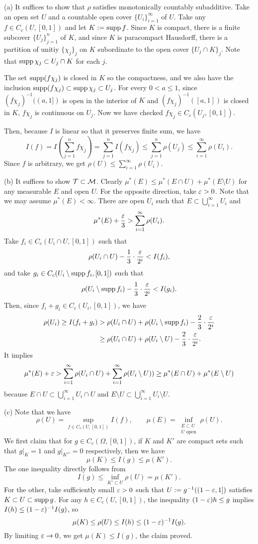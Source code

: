 \documentclass{../../large}
\begin{document}
\begin{pf}
(a)
It suffices to show that $\rho$ satisfies monotonically countably subadditive.
Take an open set $U$ and a countable open cover $\{U_i\}_{i=1}^\infty$ of $U$.
Take any $f\in C_c(U,[0,1])$ and let $K:=\operatorname{supp} f$.
Since $K$ is compact, there is a finite subcover $\{U_j\}_{j=1}^n$ of $K$, and since $K$ is paracompact Hausdorff, there is a partition of unitiy $\{\chi_j\}_j$ on $K$ subordinate to the open cover $\{U_j\cap K\}_j$.
Note that $\operatorname{supp}\chi_j\subset U_j\cap K$ for each $j$.

The set $\operatorname{supp}(f\chi_j)$ is closed in $K$ so the compactness, and we also have the inclusion $\operatorname{supp}(f\chi_j)\subset\operatorname{supp}\chi_j\subset U_j$.
For every $0<a\le 1$, since $(f\chi_j)^{-1}((a,1])$ is open in the interior of $K$ and $(f\chi_j)^{-1}([a,1])$ is closed in $K$, $f\chi_j$ is continuous on $U_j$.
Now we have checked $f\chi_j\in C_c(U_j,[0,1])$.

Then, because $I$ is linear so that it preserves finite sum, we have
\[I(f)=I\left(\sum_{j=1}^n f\chi_j\right)=\sum_{j=1}^n I(f\chi_j)\le\sum_{j=1}^n\rho(U_j)\le\sum_{i=1}^\infty\rho(U_i).\]
Since $f$ is arbitrary, we get $\rho(U)\le\sum_{i=1}^\infty\rho(U_i)$.

(b)
It suffices to show $\mathcal{T}\subset\mathcal{M}$.
Clearly $\mu^*(E)\le\mu^*(E\cap U)+\mu^*(E\setminus U)$ for any measurable $E$ and open $U$.
For the opposite direction, take $\varepsilon>0$.
Note that we may assume $\mu^*(E)<\infty$.
There are open $U_i$ such that $E\subset\bigcup_{i=1}^\infty U_i$ and
\[\mu^*(E)+\frac{\varepsilon}3>\sum_{i=1}^\infty\rho(U_i).\]
Take $f_i\in C_c(U_i\cap U,[0,1])$ such that
\[\rho(U_i\cap U)-\frac13\cdot\frac{\varepsilon}{2^i}<I(f_i),\]
and take $g_i\in C_c(U_i\setminus\operatorname{supp} f_i,[0,1])$ such that
\[\rho(U_i\setminus\operatorname{supp} f_i)-\frac13\cdot\frac{\varepsilon}{2^i}<I(g_i).\]
Then, since $f_i+g_i\in C_c(U_i,[0,1])$, we have
\begin{align*}
\rho(U_i)\ge I(f_i+g_i)
&>\rho(U_i\cap U)+\rho(U_i\setminus\operatorname{supp} f_i)-\frac23\cdot\frac{\varepsilon}{2^i}\\
&\ge\rho(U_i\cap U)+\rho(U_i\setminus U)-\frac23\cdot\frac{\varepsilon}{2^i}.
\end{align*}
It implies
\[\mu^*(E)+\varepsilon>\sum_{i=1}^\infty\rho(U_i\cap U)+\sum_{i=1}^\infty\rho(U_i\setminus U))\ge\mu^*(E\cap U)+\mu^*(E\setminus U)\]
because $E\cap U\subset\bigcup_{i=1}^\infty U_i\cap U$ and $E\setminus U\subset\bigcup_{i=1}^\infty U_i\setminus U$.


(c)
Note that we have
\[\rho(U)=\sup_{f\in C_c(U,[0,1])}I(f),\qquad\mu(E)=\inf_{\substack{E\subset U\\U\text{ open}}}\rho(U).\]
We first claim that for $g\in C_c(\Omega,[0,1])$, if $K$ and $K'$ are compact sets such that $g|_K=1$ and $g|_{K'^c}=0$ respectively, then we have
\[\mu(K)\le I(g)\le\mu(K').\]
The one inequality directly follows from
\[I(g)\le\inf_{K'\subset U}\rho(U)=\mu(K').\]
For the other, take sufficiently small $\varepsilon>0$ such that $U:=g^{-1}((1-\varepsilon,1])$ satisfies $K\subset U\subset\operatorname{supp} g$.
For any $h\in C_c(U,[0,1])$, the inequality $(1-\varepsilon)h\le g$ implies $I(h)\le(1-\varepsilon)^{-1}I(g)$, so
\[\mu(K)\le\rho(U)\le I(h)\le(1-\varepsilon)^{-1}I(g).\]
By limiting $\varepsilon\to0$, we get $\mu(K)\le I(g)$, the claim proved.



\end{pf}
\end{document}
